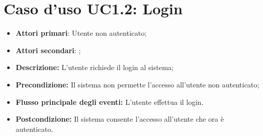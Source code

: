 		\section{Caso d'uso UC1.2: Login}
		\begin{itemize}
			\item \textbf{Attori primari}: Utente non autenticato;
			\item \textbf{Attori secondari}: ;
			\item \textbf{Descrizione:} L'utente richiede il login al sistema;
			\item \textbf{Precondizione:} Il sistema non permette l'accesso all'utente non autenticato;
			\item \textbf{Flusso principale degli eventi:} L'utente effettua il login.
			\item \textbf{Postcondizione:} Il sistema consente l'accesso all'utente che ora è autenticato.
		\end{itemize}
